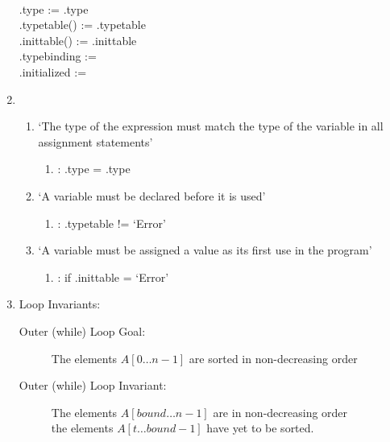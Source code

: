 \documentclass{article}
\begin{document}
\begin{enumerate}
{\it {} \rarrow {}}\\
.type := .type\\
.typetable() := .typetable\\
.inittable() := .inittable\\
.typebinding := \na\\
.initialized := \na\\


\item \begin{enumerate}
    \renewcommand\theenumiii{\arabic{enumiii}}
    \item `The type of the expression must match the type of the variable in all assignment statements'\\ \begin{enumerate}
        \item {}: .type = .type
        \end{enumerate}
    \item `A variable must be declared before it is used'\\ \begin{enumerate}
        \item {}: .typetable != `Error'
        \end{enumerate}
    \item `A variable must be assigned a value as its first use in the program'\\ \begin{enumerate}
        \item {}: if .inittable = `Error' %
        \end{enumerate}
    \end{enumerate}
\item Loop Invariants: 
    \begin{description}
    \item [Outer (while) Loop Goal:] The elements $A[0\dots n-1]$ are sorted in non-decreasing order
    \item [Outer (while) Loop Invariant:] The elements $A[bound \dots n-1]$ are in non-decreasing order \et\\
                                          the elements $A[t\dots bound-1]$ have yet to be sorted.
                                          

\end{description}
\end{enumerate}
\end{document}
